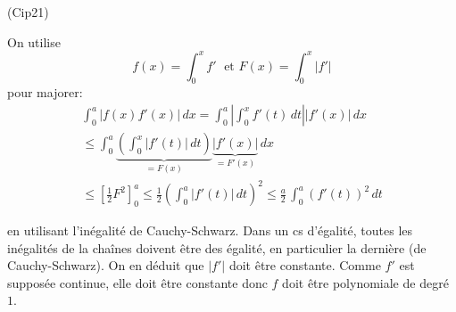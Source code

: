 \begin{tiny}(Cip21)\end{tiny} On utilise
\begin{displaymath}
 f(x)=\int_0^xf'\; \text{ et } F(x)= \int_0^x |f'|
\end{displaymath}
pour majorer:
\begin{multline*}
\int_0^a\left|f(x)f'(x)\right|\,dx
= \int_0^a\left|\int_0^xf'(t)\,dt\right|\left|f'(x)\right|\,dx\\
\leq \int_0^a \underset{=F(x)}{\underbrace{\left( \int_0^x\left|f'(t)\right|\,dt\right)}}  \underset{=F'(x)}{\underbrace{\left|f'(x)\right|}}\,dx \\
\leq \left[ \frac{1}{2}F^2\right]_0^a
\leq \frac{1}{2}\left( \int_0^a|f'(t)|\,dt\right)^2
\leq \frac{a}{2}\, \int_0^a(f'(t))^2\,dt
\end{multline*}

en utilisant l'inégalité de Cauchy-Schwarz.\newline
Dans un cs d'égalité, toutes les inégalités de la chaînes doivent être des égalité, en particulier la dernière (de Cauchy-Schwarz). On en déduit que $|f'|$ doit être constante. Comme $f'$ est supposée continue, elle doit être constante donc $f$ doit être polynomiale de degré $1$.
